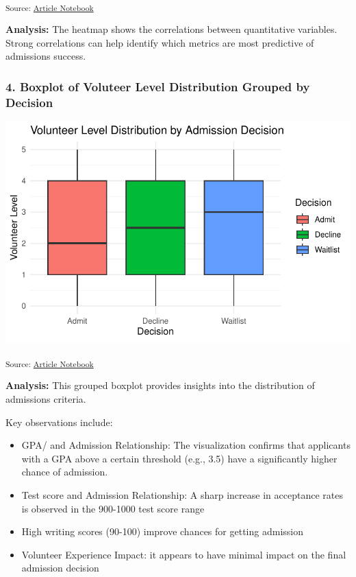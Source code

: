 \documentclass[
  letterpaper,
  DIV=11,
  numbers=noendperiod]{scrartcl}
\begin{document}
\textsubscript{Source:
\href{https://verkyyi.github.io/5900-hw1/index.qmd.html}{Article
Notebook}}

\textbf{Analysis:} The heatmap shows the correlations between
quantitative variables. Strong correlations can help identify which
metrics are most predictive of admissions success.

\subsubsection{4. Boxplot of Voluteer Level Distribution Grouped by
Decision}\label{boxplot-of-voluteer-level-distribution-grouped-by-decision}

\includegraphics{index_files/figure-pdf/boxplot-volunteer-level-1.pdf}

\textsubscript{Source:
\href{https://verkyyi.github.io/5900-hw1/index.qmd.html}{Article
Notebook}}

\textbf{Analysis:} This grouped boxplot provides insights into the
distribution of admissions criteria.

Key observations include:

\begin{itemize}
\item
  GPA/ and Admission Relationship: The visualization confirms that
  applicants with a GPA above a certain threshold (e.g., 3.5) have a
  significantly higher chance of admission.
\item
  Test score and Admission Relationship: A sharp increase in acceptance
  rates is observed in the 900-1000 test score range
\item
  High writing scores (90-100) improve chances for getting admission
\item
  Volunteer Experience Impact: it appears to have minimal impact on the
  final admission decision
\end{itemize}
\end{document}
